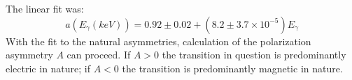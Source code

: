 The linear fit was:
\begin{equation}
\label{eqn:chp3-nat-asym-fit}
a(E_{\gamma}(keV)) = 0.92\pm0.02 + \left(8.2\pm3.7\times{}10^{-5}\right)E_{\gamma}
\end{equation}
With the fit to the natural asymmetries, calculation of the polarization asymmetry $A$ can proceed. If $A>0$ the transition in question is predominantly electric in nature; if $A<0$ the transition is predominantly magnetic in nature.